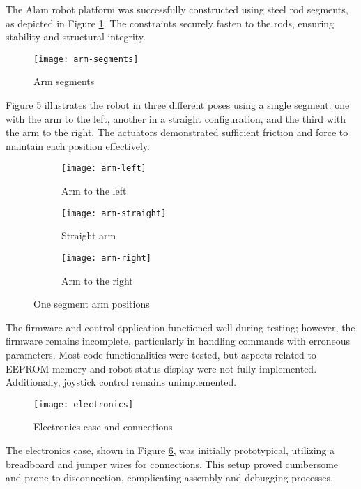 The Alam robot platform was successfully constructed using steel rod segments, as depicted in Figure \ref{fig:arm-segments}. The constraints securely fasten to the rods, ensuring stability and structural integrity.

\begin{figure}[H]
    \centering
    \texttt{[image: arm-segments]}
    \caption{Arm segments}
    \label{fig:arm-segments}
\end{figure}

Figure \ref{fig:arm-positions} illustrates the robot in three different poses using a single segment: one with the arm to the left, another in a straight configuration, and the third with the arm to the right. The actuators demonstrated sufficient friction and force to maintain each position effectively.

\begin{figure}[H]
    \centering
    \begin{subfigure}[b]{0.3\textwidth}
        \texttt{[image: arm-left]}
        \caption{Arm to the left}
        \label{fig:arm-left}
    \end{subfigure}
    \begin{subfigure}[b]{0.3\textwidth}
        \texttt{[image: arm-straight]}
        \caption{Straight arm}
        \label{fig:arm-straight}
    \end{subfigure}
    \begin{subfigure}[b]{0.3\textwidth}
        \texttt{[image: arm-right]}
        \caption{Arm to the right}
        \label{fig:arm-right}
    \end{subfigure}
    \caption{One segment arm positions}
    \label{fig:arm-positions}
\end{figure}

The firmware and control application functioned well during testing; however, the firmware remains incomplete, particularly in handling commands with erroneous parameters. Most code functionalities were tested, but aspects related to EEPROM memory and robot status display were not fully implemented. Additionally, joystick control remains unimplemented.

\begin{figure}[H]
    \centering
    \texttt{[image: electronics]}
    \caption{Electronics case and connections}
    \label{fig:electronics}
\end{figure}


The electronics case, shown in Figure \ref{fig:electronics}, was initially prototypical, utilizing a breadboard and jumper wires for connections. This setup proved cumbersome and prone to disconnection, complicating assembly and debugging processes.

